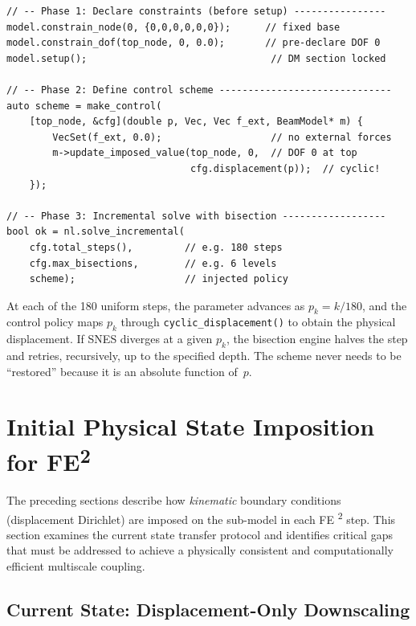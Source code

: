 \begin{lstlisting}
// -- Phase 1: Declare constraints (before setup) ----------------
model.constrain_node(0, {0,0,0,0,0,0});      // fixed base
model.constrain_dof(top_node, 0, 0.0);       // pre-declare DOF 0
model.setup();                                // DM section locked

// -- Phase 2: Define control scheme ------------------------------
auto scheme = make_control(
    [top_node, &cfg](double p, Vec, Vec f_ext, BeamModel* m) {
        VecSet(f_ext, 0.0);                   // no external forces
        m->update_imposed_value(top_node, 0,  // DOF 0 at top
                                cfg.displacement(p));  // cyclic!
    });

// -- Phase 3: Incremental solve with bisection ------------------
bool ok = nl.solve_incremental(
    cfg.total_steps(),         // e.g. 180 steps
    cfg.max_bisections,        // e.g. 6 levels
    scheme);                   // injected policy
\end{lstlisting}

At each of the 180 uniform steps, the parameter advances as
$p_k = k/180$, and the control policy maps $p_k$ through
\texttt{cyclic\_displacement()} to obtain the physical displacement.
If SNES diverges at a given $p_k$, the bisection engine
halves the step and retries, recursively, up to the specified depth.
The scheme never needs to be ``restored'' because it is an absolute
function of~$p$.


\section{Initial Physical State Imposition for FE\textsuperscript{2}}
\label{sec:initial-state-fe2}

The preceding sections describe how \emph{kinematic} boundary conditions
(displacement Dirichlet) are imposed on the sub-model in each FE%
\textsuperscript{2} step.  This section examines the current state
transfer protocol and identifies critical gaps that must be addressed
to achieve a physically consistent and computationally efficient
multiscale coupling.

\subsection{Current State: Displacement-Only Downscaling}
\label{ssec:displacement-only}

